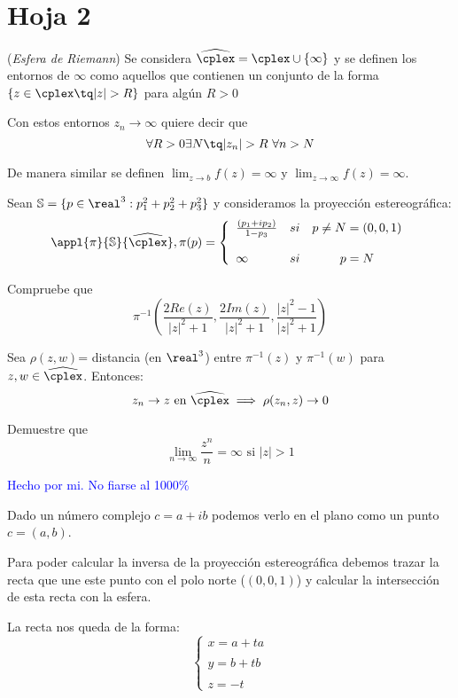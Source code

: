 \section{Hoja 2}
\begin{problem}[1]
(\textit{Esfera de Riemann}) Se considera $\widehat{\cplex} = \cplex \cup \{\infty\}$ y se definen los entornos de $\infty$ como aquellos que contienen un conjunto de la forma $\{z \in \cplex \tq |z|>R\}$ para algún $R > 0$

Con estos entornos $z_n \to \infty$ quiere decir que
\[\forall R > 0 \exists N \tq |z_n| > R \ \forall n > N\]

De manera similar se definen $\lim_{z \to b} f(z)= \infty$ y $\lim_{z \to \infty}f(z)=\infty$.

Sean $\mathbb{S}= \{p \in \real^3 : p_1^2+p_2^2+p_3^2\}$ y consideramos la proyección estereográfica:
\[\appl{\pi}{\mathbb{S}}{\widehat{\cplex}}, \pi(p) = \left\{
\begin{array}{lcc}
    \frac{(p_1+ip_2)}{1-p_3} & si & p \neq N = (0,0,1) \\
 \\ \infty & si & p = N
 \end{array} \right.\]

 \ppart
 Compruebe que
 \[\pi^{-1}\left( \frac{2Re(z)}{|z|^2+1}, \frac{2Im(z)}{|z|^2+1}, \frac{|z|^2-1}{|z|^2+1}\right)\]

 \ppart
 Sea $\rho(z,w)$= distancia (en $\real^3$) entre $\pi^{-1}(z)$ y $\pi^{-1}(w)$ para $z,w \in \widehat{\cplex}$. Entonces:
 \[z_n \to z \text{ en } \widehat{\cplex} \implies \rho(z_n,z) \to 0\]

 \ppart
 Demuestre que
 \[\lim_{n \to \infty}\frac{z^n}{n} = \infty \text{ si } |z| > 1\]

\solution
\textcolor{blue}{Hecho por mi. No fiarse al 1000\%}

\spart
Dado un número complejo $c=a+ib$ podemos verlo en el plano como un punto $c=(a,b)$.

Para poder calcular la inversa de la proyección estereográfica debemos trazar la recta que une este punto con el polo norte ($(0,0,1)$) y calcular la intersección de esta recta con la esfera.

La recta nos queda de la forma:
\[ \left\{
\begin{array}{l}
    x = a+ta\\
 \\ y = b+tb \\
 \\ z = -t
 \end{array} \right.\]


\end{problem}
